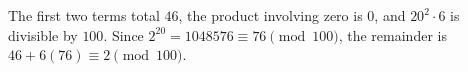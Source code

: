 The first two terms total $46$, the product involving zero is $0$, and $20^2\cdot6$ is divisible by $100$. Since $2^{20}=1048576\equiv76\pmod{100}$, the remainder is $46+6(76)\equiv\boxed2\pmod{100}$.
